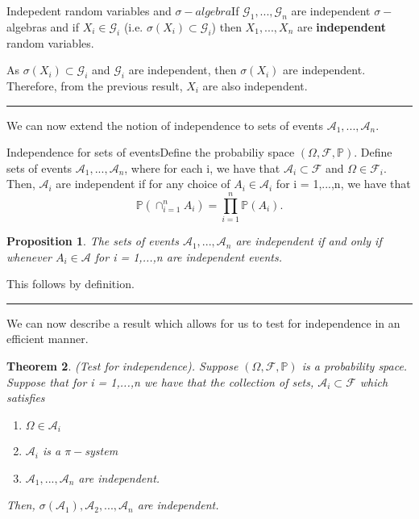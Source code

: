 \documentclass[twoside]{article}
\newcounter{lecnum}
\newtheorem{theorem}{Theorem}[lecnum]
\newtheorem{proposition}[theorem]{Proposition}
\newenvironment{proof}{{\bf Proof:}}{\hfill\rule{2mm}{2mm}}
\newcommand{\algebra}{\mathcal{A}}
\newcommand{\sigmalgebra}{\mathcal{F}}
\newcommand{\sa}{\sigma-algebra}
\newcommand{\prob}{\mathbb{P}}
\begin{document}
\begin{theorem_exam}{Indepedent random variables and $\sa$}{}If $\mathcal{G}_1,...,\mathcal{G}_n$ are independent $\sigma-$algebras and if $X_i \in \mathcal{G}_i$ (i.e. $\sigma(X_i) \subset \mathcal{G}_i$) then $X_1,...,X_n$ are \textbf{independent} random variables.
\end{theorem_exam}

\begin{proof} As $\sigma(X_i) \subset \mathcal{G}_i$ and $\mathcal{G}_i$ are independent, then $\sigma(X_i)$ are independent. Therefore, from the previous result, $X_i$ are also independent.
\end{proof}


We can now extend the notion of independence to sets of events $\algebra_1, ..., \algebra_n$.

\begin{definition_exam}{Independence for sets of events}{}Define the probabiliy space $(\Omega, \sigmalgebra, \prob).$ Define sets of events $\algebra_1,...,\algebra_n$, where for each i, we have that 
$
\algebra_i \subset \sigmalgebra
$
 and $\Omega \in \sigmalgebra_i.$ Then, $\algebra_i$ are independent if for any choice of $A_i \in \algebra_i$ for i = 1,...,n, we have that 
 $$
\prob(\cap_{i=1}^{n}A_i) = \prod_{i=1}^{n}\prob(A_i).
 $$
\end{definition_exam}

\begin{proposition} The sets of events $\algebra_1,...,\algebra_n$ are independent if and only if whenever $A_i \in \algebra$ for i = 1,...,n are independent events.
\end{proposition}

\begin{proof} This follows by definition. 
\end{proof}

We can now describe a result which allows for us to test for independence in an efficient manner.

\begin{theorem}(Test for independence). Suppose $(\Omega, \sigmalgebra, \prob)$ is a probability space. Suppose that for i = 1,...,n we have that the collection of sets, $\mathcal{A}_i \subset \mathcal{F}$ which satisfies 
\begin{enumerate}
\item $\Omega \in \mathcal{A}_i$
\item $\mathcal{A}_i$ is a $\pi-$system
\item $\mathcal{A}_1,...,\mathcal{A}_n$ are independent.
\end{enumerate}
Then, $\sigma(\mathcal{A}_1), \mathcal{A}_2,...,\mathcal{A}_n$ are independent.
\end{theorem}
\end{document}
